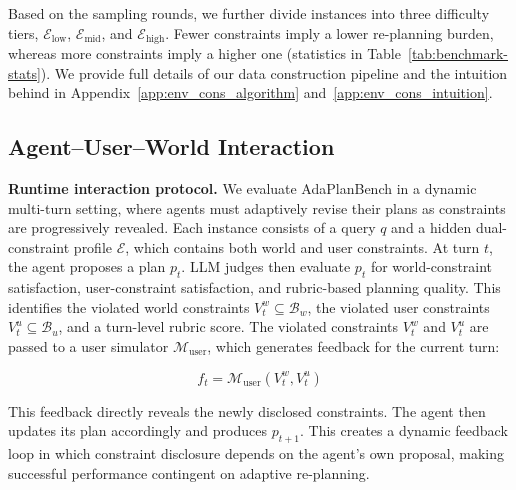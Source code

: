 \documentclass{llmxive}
\providecommand{\bench}[1]{AdaPlanBench}
\begin{document}
Based on the sampling rounds, we further divide instances into three difficulty tiers, $\mathcal{E}_{\mathrm{low}}$, $\mathcal{E}_{\mathrm{mid}}$, and $\mathcal{E}_{\mathrm{high}}$. Fewer constraints imply a lower re-planning burden, whereas more constraints imply a higher one (statistics in Table~\ref{tab:benchmark-stats}). 
We provide full details of our data construction pipeline and the intuition behind in Appendix~\ref{app:env_cons_algorithm} and~\ref{app:env_cons_intuition}.

\subsection{Agent--User--World Interaction}
\label{sec:inference-loop}

\noindent\textbf{Runtime interaction protocol.}
We evaluate \bench{} in a dynamic multi-turn setting, where agents must adaptively revise their plans as constraints are progressively revealed.
Each instance consists of a query \(q\) and a hidden dual-constraint profile \(\mathcal{E}\), which contains both world and user constraints.
At turn \(t\), the agent proposes a plan \(p_t\).
LLM judges then evaluate \(p_t\) for world-constraint satisfaction, user-constraint satisfaction, and rubric-based planning quality.
This identifies the violated world constraints \(V_t^w \subseteq \mathcal{B}_w\), the violated user constraints \(V_t^u \subseteq \mathcal{B}_u\), and a turn-level rubric score.
The violated constraints \(V_t^w\) and \(V_t^u\) are passed to a user simulator \(\mathcal{M}_{\mathrm{user}}\), which generates feedback for the current turn:
\begin{footnotesize}
\begin{equation}
f_t = \mathcal{M}_{\mathrm{user}}(V_t^w, V_t^u)
\end{equation}
\end{footnotesize}
This feedback directly reveals the newly disclosed constraints.
The agent then updates its plan accordingly and produces \(p_{t+1}\).
This creates a dynamic feedback loop in which constraint disclosure depends on the agent's own proposal, making successful performance contingent on adaptive re-planning.
\end{document}
